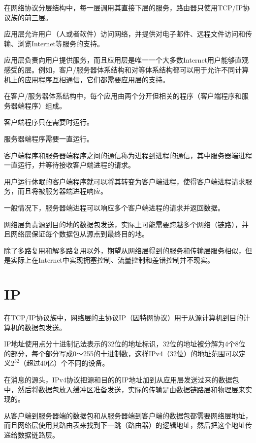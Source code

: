 在网络协议分层结构中，每一层调用其直接下层的服务，路由器只使用TCP/IP协议族的前三层。

应用层允许用户（人或者软件）访问网络，并提供对电子邮件、远程文件访问和传输、浏览Internet等服务的支持。

应用层负责向用户提供服务，而且应用层是唯一一个大多数Internet用户能够直观感受的层。例如，客户/服务器体系结构和对等体系结构都可以用于允许不同计算机上的应用程序互相通信，它们都需要应用层的支持。

在客户/服务器体系结构中，每个应用由两个分开但相关的程序（客户端程序和服务器端程序）组成。

\begin{compactitem}
\item 客户端程序只在需要时运行。
\item 服务器端程序需要一直运行。
\end{compactitem}

客户端程序和服务器端程序之间的通信称为进程到进程的通信，其中服务器端进程一直运行，并等待接收客户端进程的请求。

用户运行休眠的客户端程序就可以将其转变为客户端进程，使得客户端进程请求服务，而且将被服务器端进程响应。

一般情况下，服务器端进程可以响应多个客户端进程的请求并返回数据。

网络层负责源到目的地的数据包发送，实际上可能需要跨越多个网络（链路），并且网络层保证每个数据包从源点到最终目的地。

除了多路复用和解多路复用以外，期望从网络层得到的服务和传输层服务相似，但是实际上在Internet中实现拥塞控制、流量控制和差错控制并不现实。



\section{IP}

在TCP/IP协议族中，网络层的主协议IP（因特网协议）用于从源计算机到目的计算机的数据包发送。



IP地址使用点分十进制记法表示的32位的地址标识，32位的地址被分解为4个8位的部分，每个部分写成0～255的十进制数，这样IPv4（32位）的地址范围可以定义$2^{32}$（超过40亿）个不同的设备。

在消息的源头，IPv4协议把源和目的的IP地址加到从应用层发送过来的数据包中，然后将数据包放入缓冲区准备发送，实际的传输是由数据链路层和物理层来实现的。

从客户端到服务器端的数据包和从服务器端到客户端的数据包都需要网络层地址，而且网络层使用其路由表来找到下一跳（路由器）的逻辑地址，然后把这个地址传递给数据链路层。

